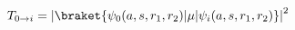 %
%

\begin{equation}
   T_{0 \rightarrow i} =
       \left| \braket{\psi_{0}(a, s, r_1, r_2) | \mu | \psi_{i}(a, s, r_1, r_2)} \right|^2
\label{eq:spec_osc}
\end{equation}

%